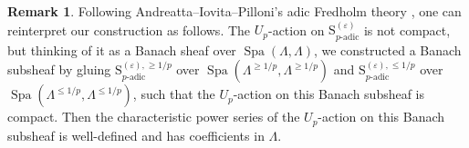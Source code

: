 \documentclass[12pt]{amsart}
\theoremstyle{definition}
\newtheorem{remark}[subsection]{Remark}
\numberwithin{equation}{subsection}
\def\calW{\mathcal{W}}
\def\gothm{\mathfrak{m}}
\def\CC{\mathbb{C}}
\def\rmS{\mathrm{S}}
\DeclareMathOperator{\Spa}{Spa}
\begin{document}

\begin{remark}
Following Andreatta--Iovita--Pilloni's adic Fredholm theory \cite{AIP}, one can reinterpret our construction as follows.
The $U_p$-action on $\rmS_{p\textrm{-adic}}^{(\varepsilon)}$ is not compact,
but thinking of it as a Banach sheaf over $\Spa(\Lambda, \Lambda)$, we constructed a Banach subsheaf by gluing $\rmS_{p\textrm{-adic}}^{(\varepsilon),\geq 1/p}$ over $\Spa(\Lambda^{\geq 1/p}, \Lambda^{\geq 1/p})$ and $\rmS_{p\textrm{-adic}}^{(\varepsilon),\leq 1/p}$ over $\Spa(\Lambda^{\leq 1/p}, \Lambda^{\leq 1/p})$, such that the $U_p$-action on this Banach subsheaf is compact.
Then the characteristic power series of the $U_p$-action on this Banach subsheaf is well-defined and has coefficients in $\Lambda$.
\end{remark}






\end{document}
